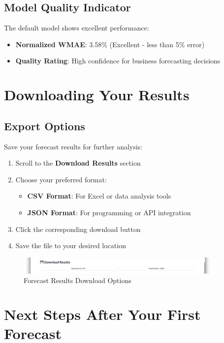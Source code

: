 \subsection{Model Quality Indicator}

The default model shows excellent performance:

\begin{itemize}
	\item \textbf{Normalized WMAE}: 3.58\% (Excellent - less than 5\% error)
	\item \textbf{Quality Rating}: High confidence for business forecasting decisions
\end{itemize}

\section{Downloading Your Results}

\subsection{Export Options}

Save your forecast results for further analysis:

\begin{enumerate}
	\item Scroll to the \textbf{Download Results} section
	\item Choose your preferred format:
	\begin{itemize}
		\item \textbf{CSV Format}: For Excel or data analysis tools
		\item \textbf{JSON Format}: For programming or API integration
	\end{itemize}
	\item Click the corresponding download button
	\item Save the file to your desired location
\end{enumerate}

\begin{figure}[H]
	\centering
	\includegraphics[width=0.9\textwidth]{Images/03FirstStepsGuide/DownloadOptions.png}
	\caption{Forecast Results Download Options}
	\label{fig:download_options}
\end{figure}

\section{Next Steps After Your First Forecast}

